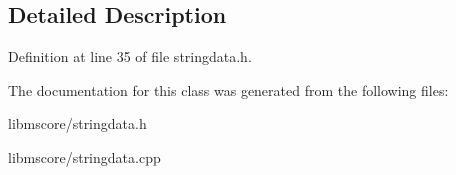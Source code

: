 \subsection{Detailed Description}


Definition at line 35 of file stringdata.\+h.



The documentation for this class was generated from the following files\+:\begin{DoxyCompactItemize}
\item 
libmscore/stringdata.\+h\item 
libmscore/stringdata.\+cpp\end{DoxyCompactItemize}
